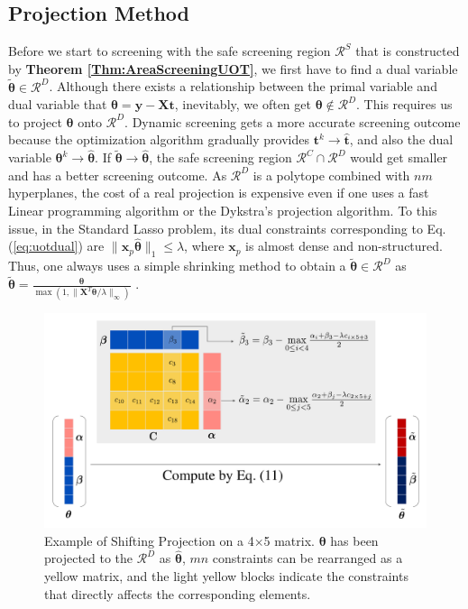\documentclass[twoside]{article}
\theoremstyle{plain}
\newcommand{\mat}[1]{\mathbf{#1}}
\renewcommand{\vec}[1]{\bm{#1}}
\begin{document}
\subsection{Projection Method}

Before we start to screening with the safe screening region $\mathcal{R}^S$ that is constructed by {\bf Theorem \ref{Thm:AreaScreeningUOT}}, we first have to find a dual variable $\tilde{\vec{\theta}}\in\mathcal{R}^{D}$. Although there exists a relationship between the primal variable and dual variable that $\vec{\theta} = \vec{y} - \mat{X}\vec{t}$, inevitably, we often get $\vec{\theta} \notin \mathcal{R}^{D}$. This requires us to project $\vec{\theta}$ onto $\mathcal{R}^{D}$. Dynamic screening gets a more accurate screening outcome because the optimization algorithm gradually provides $\vec t^{k} \rightarrow \hat{\vec t}$, and also the dual variable $\vec \theta^{k} \rightarrow \hat{\vec \theta}$. If $\vec{ \tilde{\theta}}\rightarrow \hat{\vec \theta}$, the safe screening region $\mathcal{R}^{C}\cap\mathcal{R}^{D}$ would get smaller and has a better screening outcome. As $\mathcal{R}^{D}$ is a polytope combined with $nm$ hyperplanes, the cost of a real projection is expensive even if one uses a fast Linear programming algorithm or the Dykstra's projection algorithm. To this issue, in the Standard Lasso problem, its dual constraints corresponding to {Eq.(\ref{eq:uotdual})} are $\|\vec{x}_p \hat{\vec{\theta}}\|_1\leq \lambda$, where $\vec{x}_p$ is almost dense and non-structured. Thus, one always uses a simple shrinking method to obtain a $\tilde{\vec{\theta}} \in \mathcal{R}^{D}$ as 
$
\tilde{\vec{\theta}} = \frac{\vec\theta}{\max(1, \|{\mat{X}^T\vec\theta}/{\lambda}\|_{\infty})}
$ {\citep[Proposition 11]{JMLR:v18:16-577} \citep[Theorem 11]{Yamada_NIPS_2021}}. 

\begin{figure}[t]
\centering
\includegraphics[width = \linewidth]{pic/matrix}
\caption{Example of Shifting Projection on a 4$\times$5 matrix. $\vec \theta$ has been projected to the $\mathcal{R}^{D}$ as $\vec{\hat{\theta}}$, $mn$ constraints can be rearranged as a yellow matrix, and the light yellow blocks indicate the constraints that directly affects the corresponding elements.}
\label{Fig:structure}
\end{figure}
\end{document}
